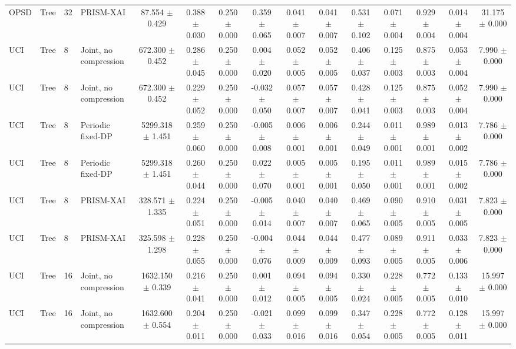 \begin{tabular}{llllccccccccccc}
OPSD & Tree & 32 & PRISM-XAI & 87.554 $\pm$ 0.429 & 0.388 $\pm$ 0.030 & 0.250 $\pm$ 0.000 & 0.359 $\pm$ 0.065 & 0.041 $\pm$ 0.007 & 0.041 $\pm$ 0.007 & 0.531 $\pm$ 0.102 & 0.071 $\pm$ 0.004 & 0.929 $\pm$ 0.004 & 0.014 $\pm$ 0.004 & 31.175 $\pm$ 0.000 \\
UCI & Tree & 8 & Joint, no compression & 672.300 $\pm$ 0.452 & 0.286 $\pm$ 0.045 & 0.250 $\pm$ 0.000 & 0.004 $\pm$ 0.020 & 0.052 $\pm$ 0.005 & 0.052 $\pm$ 0.005 & 0.406 $\pm$ 0.037 & 0.125 $\pm$ 0.003 & 0.875 $\pm$ 0.003 & 0.053 $\pm$ 0.004 & 7.990 $\pm$ 0.000 \\
UCI & Tree & 8 & Joint, no compression & 672.300 $\pm$ 0.452 & 0.229 $\pm$ 0.052 & 0.250 $\pm$ 0.000 & -0.032 $\pm$ 0.050 & 0.057 $\pm$ 0.007 & 0.057 $\pm$ 0.007 & 0.428 $\pm$ 0.041 & 0.125 $\pm$ 0.003 & 0.875 $\pm$ 0.003 & 0.052 $\pm$ 0.004 & 7.990 $\pm$ 0.000 \\
UCI & Tree & 8 & Periodic fixed-DP & 5299.318 $\pm$ 1.451 & 0.259 $\pm$ 0.060 & 0.250 $\pm$ 0.000 & -0.005 $\pm$ 0.008 & 0.006 $\pm$ 0.001 & 0.006 $\pm$ 0.001 & 0.244 $\pm$ 0.049 & 0.011 $\pm$ 0.001 & 0.989 $\pm$ 0.001 & 0.013 $\pm$ 0.002 & 7.786 $\pm$ 0.000 \\
UCI & Tree & 8 & Periodic fixed-DP & 5299.318 $\pm$ 1.451 & 0.260 $\pm$ 0.044 & 0.250 $\pm$ 0.000 & 0.022 $\pm$ 0.070 & 0.005 $\pm$ 0.001 & 0.005 $\pm$ 0.001 & 0.195 $\pm$ 0.050 & 0.011 $\pm$ 0.001 & 0.989 $\pm$ 0.001 & 0.015 $\pm$ 0.002 & 7.786 $\pm$ 0.000 \\
UCI & Tree & 8 & PRISM-XAI & 328.571 $\pm$ 1.335 & 0.224 $\pm$ 0.051 & 0.250 $\pm$ 0.000 & -0.005 $\pm$ 0.014 & 0.040 $\pm$ 0.007 & 0.040 $\pm$ 0.007 & 0.469 $\pm$ 0.065 & 0.090 $\pm$ 0.005 & 0.910 $\pm$ 0.005 & 0.031 $\pm$ 0.005 & 7.823 $\pm$ 0.000 \\
UCI & Tree & 8 & PRISM-XAI & 325.598 $\pm$ 1.298 & 0.228 $\pm$ 0.055 & 0.250 $\pm$ 0.000 & -0.004 $\pm$ 0.076 & 0.044 $\pm$ 0.009 & 0.044 $\pm$ 0.009 & 0.477 $\pm$ 0.093 & 0.089 $\pm$ 0.005 & 0.911 $\pm$ 0.005 & 0.033 $\pm$ 0.006 & 7.823 $\pm$ 0.000 \\
UCI & Tree & 16 & Joint, no compression & 1632.150 $\pm$ 0.339 & 0.216 $\pm$ 0.041 & 0.250 $\pm$ 0.000 & 0.001 $\pm$ 0.012 & 0.094 $\pm$ 0.005 & 0.094 $\pm$ 0.005 & 0.330 $\pm$ 0.024 & 0.228 $\pm$ 0.005 & 0.772 $\pm$ 0.005 & 0.133 $\pm$ 0.010 & 15.997 $\pm$ 0.000 \\
UCI & Tree & 16 & Joint, no compression & 1632.600 $\pm$ 0.554 & 0.204 $\pm$ 0.011 & 0.250 $\pm$ 0.000 & -0.021 $\pm$ 0.033 & 0.099 $\pm$ 0.016 & 0.099 $\pm$ 0.016 & 0.347 $\pm$ 0.054 & 0.228 $\pm$ 0.005 & 0.772 $\pm$ 0.005 & 0.128 $\pm$ 0.011 & 15.997 $\pm$ 0.000 \\

\end{tabular}

